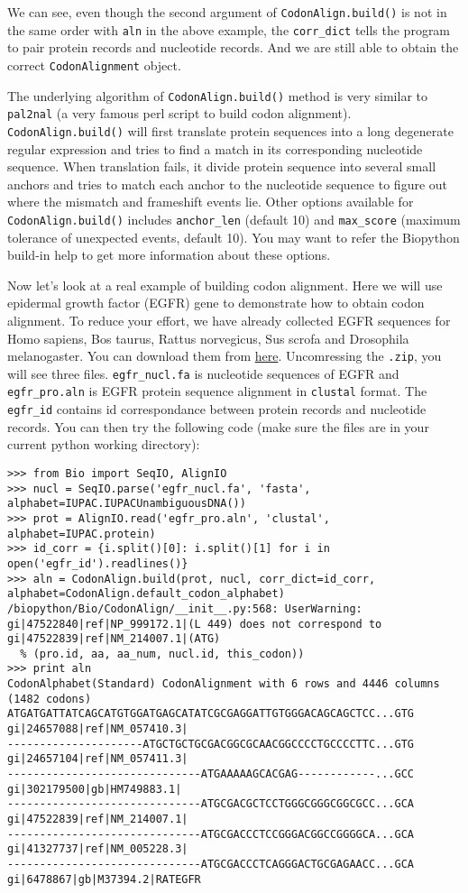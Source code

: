 We can see, even though the second argument of \verb|CodonAlign.build()|
is not in the same order with \texttt{aln} in the above example, the
\texttt{corr\_dict} tells the program to pair protein records and
nucleotide records. And we are still able to obtain the correct
\verb|CodonAlignment| object.

The underlying algorithm of \verb|CodonAlign.build()| method is very
similar to \texttt{pal2nal} (a very famous perl script to build codon
alignment). \verb|CodonAlign.build()| will first translate protein
sequences into a long degenerate regular expression and tries to find a
match in its corresponding nucleotide sequence. When translation fails,
it divide protein sequence into several small anchors and tries to match
each anchor to the nucleotide sequence to figure out where the mismatch
and frameshift events lie. Other options available for
\verb|CodonAlign.build()| includes \texttt{anchor\_len} (default 10) and
\texttt{max\_score} (maximum tolerance of unexpected events, default
10). You may want to refer the Biopython build-in help to get more
information about these options.

Now let's look at a real example of building codon alignment. Here we
will use epidermal growth factor (EGFR) gene to demonstrate how to
obtain codon alignment. To reduce your effort, we have already collected
EGFR sequences for Homo sapiens, Bos taurus, Rattus norvegicus,
Sus scrofa and Drosophila melanogaster. You can download them from
\href{http://zruanweb.com/egfr.zip}{here}. Uncomressing the
\texttt{.zip}, you will see three files. \texttt{egfr\_nucl.fa} is
nucleotide sequences of EGFR and \texttt{egfr\_pro.aln} is EGFR protein
sequence alignment in \texttt{clustal} format. The \texttt{egfr\_id}
contains id correspondance between protein records and nucleotide
records. You can then try the following code (make sure the files are in
your current python working directory):

\begin{verbatim}
>>> from Bio import SeqIO, AlignIO
>>> nucl = SeqIO.parse('egfr_nucl.fa', 'fasta', alphabet=IUPAC.IUPACUnambiguousDNA())
>>> prot = AlignIO.read('egfr_pro.aln', 'clustal', alphabet=IUPAC.protein)
>>> id_corr = {i.split()[0]: i.split()[1] for i in open('egfr_id').readlines()}
>>> aln = CodonAlign.build(prot, nucl, corr_dict=id_corr, alphabet=CodonAlign.default_codon_alphabet)
/biopython/Bio/CodonAlign/__init__.py:568: UserWarning: gi|47522840|ref|NP_999172.1|(L 449) does not correspond to gi|47522839|ref|NM_214007.1|(ATG)
  % (pro.id, aa, aa_num, nucl.id, this_codon))
>>> print aln
CodonAlphabet(Standard) CodonAlignment with 6 rows and 4446 columns (1482 codons)
ATGATGATTATCAGCATGTGGATGAGCATATCGCGAGGATTGTGGGACAGCAGCTCC...GTG gi|24657088|ref|NM_057410.3|
---------------------ATGCTGCTGCGACGGCGCAACGGCCCCTGCCCCTTC...GTG gi|24657104|ref|NM_057411.3|
------------------------------ATGAAAAAGCACGAG------------...GCC gi|302179500|gb|HM749883.1|
------------------------------ATGCGACGCTCCTGGGCGGGCGGCGCC...GCA gi|47522839|ref|NM_214007.1|
------------------------------ATGCGACCCTCCGGGACGGCCGGGGCA...GCA gi|41327737|ref|NM_005228.3|
------------------------------ATGCGACCCTCAGGGACTGCGAGAACC...GCA gi|6478867|gb|M37394.2|RATEGFR
\end{verbatim}

